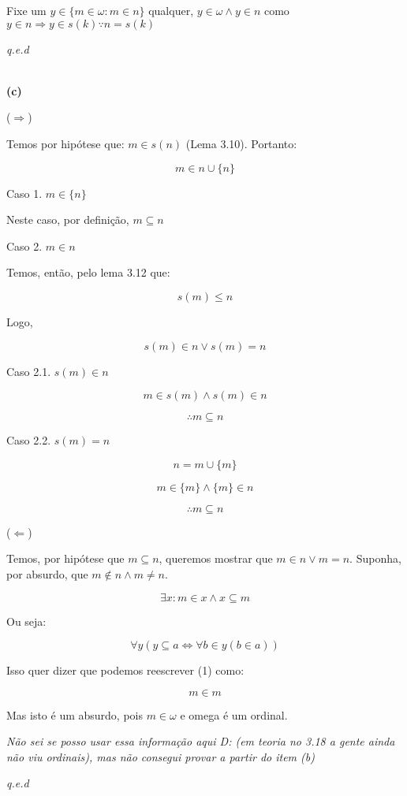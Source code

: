 \documentclass[12pt]{extarticle}
\newcommand{\fim}{\begin{flushright}

   \emph{q.e.d}
\end{flushright}}
\begin{document}
Fixe um $y \in \{m \in \omega : m \in n\}$ qualquer, $y \in \omega \land y \in n$ como $y \in n \Rightarrow y \in s(k) \because n = s(k)$
\fim
\\
\textbf{(c)}

($\Rightarrow$)

Temos por hipótese que: $m \in s(n)$ (Lema 3.10). Portanto:

$$
m \in n \cup \{n\}
$$

Caso 1. $m \in \{n\}$

Neste caso, por definição, $m \subseteq n$ 

Caso 2. $m \in n$

Temos, então, pelo lema 3.12 que:

$$
s(m) \leq n
$$

Logo,

$$
s(m) \in n \lor s(m) = n
$$

Caso 2.1. $s(m) \in n$

$$
m \in s(m) \land s(m) \in n
$$

$$
\therefore m \subseteq n
$$

Caso 2.2. $s(m) = n$

$$
n = m \cup \{m\} 
$$

$$
m \in \{m\} \land \{m\} \in n
$$

$$
\therefore m \subseteq n 
$$

($\Leftarrow$)

Temos, por hipótese que $m \subseteq n$, queremos mostrar que $m \in n \lor m = n$. Suponha, por absurdo, que $m \notin n \land m \neq n$. 

\begin{equation}
\exists x : m \in x \land x \subseteq m     
\end{equation}



Ou seja:

$$
\forall y ( y \subseteq a \Leftrightarrow \forall b \in y (b \in a))
$$

Isso quer dizer que podemos reescrever (1) como:

$$
m \in m
$$

Mas isto é um absurdo, pois $m \in \omega$ e omega é um ordinal.

\textit{Não sei se posso usar essa informação aqui D: (em teoria no 3.18 a gente ainda não viu ordinais), mas não consegui provar a partir do item (b)}

\fim
\end{document}
